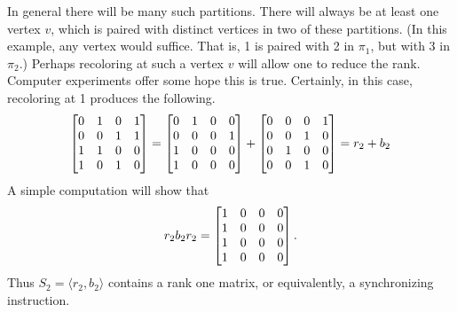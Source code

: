 In general there will be many such partitions.  
There will always be at least one vertex $v$, which is paired with distinct vertices in two of these partitions.  
(In this example, any vertex would suffice.  
That is, 1 is paired with 2 in $\pi_1$, but with 3 in $\pi_2$.)  
Perhaps recoloring at such a vertex $v$ will allow one to reduce the rank.
Computer experiments offer some hope this is true.
Certainly, in this case, recoloring at 1 produces the following.
\[
	\bmatrix
	0 &1 &0 &1 \\
	0 &0 &1 &1 \\
	1 &1 &0 &0 \\
	1 &0 &1 &0 \endbmatrix
	=
	\bmatrix
	0 &1 &0 &0 \\
	0 &0 &0 &1 \\
	1 &0 &0 &0 \\
	1 &0 &0 &0 \endbmatrix
	+
	\bmatrix
	0 &0 &0 &1 \\
	0 &0 &1 &0 \\
	0 &1 &0 &0 \\
	0 &0 &1 &0 \endbmatrix
	= r_2 + b_2
\]
A simple computation will show that
\[
	r_2b_2r_2 = \bmatrix
		1 &0 &0 &0 \\
		1 &0 &0 &0 \\
		1 &0 &0 &0 \\ 
		1 &0 &0 &0 \endbmatrix.
\]
Thus $S_2 = \langle r_2,b_2 \rangle$ contains a rank one matrix, or
equivalently, a synchronizing instruction.
